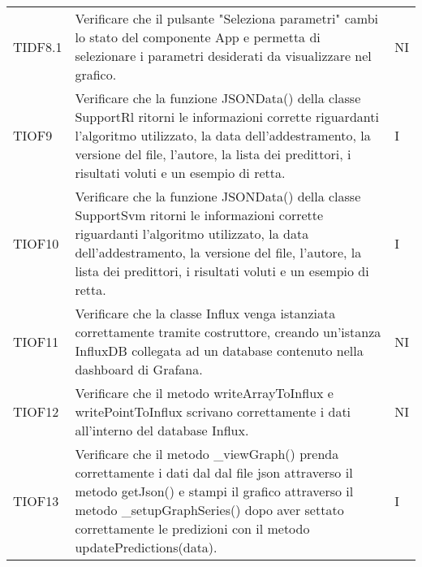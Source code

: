 \begin{longtable}{C{2cm} L{8cm} C{2cm}}
TIDF8.1 & Verificare che il pulsante "Seleziona parametri" cambi lo stato del componente App e permetta di selezionare i parametri desiderati da visualizzare nel grafico. & NI \\
TIOF9 & Verificare che la funzione JSONData() della classe SupportRl ritorni le informazioni corrette riguardanti l'algoritmo utilizzato, la data dell'addestramento, la versione del file, l'autore, la lista dei predittori, i risultati voluti e un esempio di retta. & I \\
TIOF10 & Verificare che la funzione JSONData() della classe SupportSvm ritorni le informazioni corrette riguardanti l'algoritmo utilizzato, la data dell'addestramento, la versione del file, l'autore, la lista dei predittori, i risultati voluti e un esempio di retta. & I \\
TIOF11 & Verificare che la classe Influx venga istanziata correttamente tramite costruttore, creando un’istanza InfluxDB collegata ad un database contenuto nella dashboard di Grafana. & NI \\
TIOF12 & Verificare che il metodo writeArrayToInflux e writePointToInflux scrivano correttamente i dati all'interno del database Influx. & NI \\
TIOF13 & Verificare che il metodo \_viewGraph() prenda correttamente i dati dal dal file json attraverso il metodo getJson() e stampi il grafico attraverso il metodo \_setupGraphSeries() dopo aver settato correttamente le predizioni con il metodo updatePredictions(data). & I \\
\end{longtable}
\pagebreak
